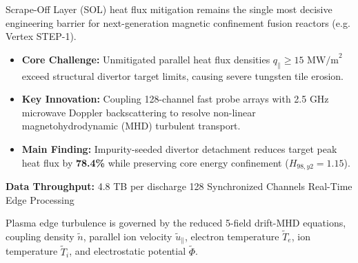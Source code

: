 \documentclass[landscape,a0,final]{a0poster}
\newlength{\colwidth}
\begin{document}
\vspace{8pt}

\noindent%
\begin{minipage}[t]{\colwidth}

  \begin{tcolorbox}[posterbox, title={\faLightbulb\ 1. Executive Summary \& Physics Challenge}]
    Scrape-Off Layer (SOL) heat flux mitigation remains the single most decisive engineering barrier for next-generation magnetic confinement fusion reactors (e.g. Vertex STEP-1).
    
    \begin{itemize}[leftmargin=1.2em, itemsep=3pt]
      \item \textbf{Core Challenge:} Unmitigated parallel heat flux densities \(q_\parallel \ge 15\text{ MW/m}^2\) exceed structural divertor target limits, causing severe tungsten tile erosion.
      \item \textbf{Key Innovation:} Coupling 128-channel fast probe arrays with 2.5 GHz microwave Doppler backscattering to resolve non-linear magnetohydrodynamic (MHD) turbulent transport.
      \item \textbf{Main Finding:} Impurity-seeded divertor detachment reduces target peak heat flux by \textbf{78.4\%} while preserving core energy confinement (\(H_{98,y2} = 1.15\)).
    \end{itemize}

    \vspace{4pt}
    \begin{tcolorbox}[accentbox]
      \centering \small
      \textbf{Data Throughput:} 4.8 TB per discharge \textbullet{} 128 Synchronized Channels \textbullet{} Real-Time Edge Processing
    \end{tcolorbox}
  \end{tcolorbox}

  \begin{tcolorbox}[posterbox, title={\faAtom\ 2. 5-Field Gyrofluid Transport Model}]
    Plasma edge turbulence is governed by the reduced 5-field drift-MHD equations, coupling density \(\tilde{n}\), parallel ion velocity \(\tilde{u}_\parallel\), electron temperature \(\tilde{T}_e\), ion temperature \(\tilde{T}_i\), and electrostatic potential \(\tilde{\Phi}\).


\end{tcolorbox}
\end{minipage}
\end{document}
